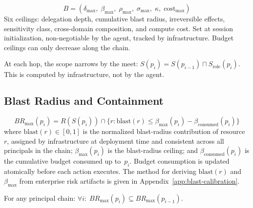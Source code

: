 \documentclass[sigconf,nonacm]{acmart}
\begin{document}
\begin{definition}\label{def:budget}
\[
B = (\delta_{\max},\; \beta_{\max},\; \rho_{\max},\; \sigma_{\max},\; \kappa,\; \mathrm{cost}_{\max})
\]
Six ceilings: delegation depth, cumulative blast radius, irreversible effects, sensitivity class, cross-domain composition, and compute cost. Set at session initialization, non-negotiable by the agent, tracked by infrastructure. Budget ceilings can only decrease along the chain.
\end{definition}

\begin{definition}\label{def:scoped}
At each hop, the scope narrows by the meet: $S(p_i) = S(p_{i-1}) \sqcap S_{\mathrm{role}}(p_i)$. This is computed by infrastructure, not by the agent.
\end{definition}

\subsection{Blast Radius and Containment}

\begin{definition}\label{def:blast}
\begin{equation*}
BR_{\max}(p_i) = R(S(p_i)) \cap \bigl\{r : \mathrm{blast}(r) \leq \beta_{\max}(p_i) - \beta_{\mathrm{consumed}}(p_i)\bigr\}
\end{equation*}
where $\mathrm{blast}(r) \in [0,1]$ is the normalized blast-radius contribution of resource~$r$, assigned by infrastructure at deployment time and consistent across all principals in the chain; $\beta_{\max}(p_i)$ is the blast-radius ceiling; and $\beta_{\mathrm{consumed}}(p_i)$ is the cumulative budget consumed up to~$p_i$. Budget consumption is updated atomically before each action executes. The method for deriving $\mathrm{blast}(r)$ and $\beta_{\max}$ from enterprise risk artifacts is given in Appendix~\ref{app:blast-calibration}.
\end{definition}

\begin{theorem}\label{thm:blast-radius}
For any principal chain: $\forall i:\; BR_{\max}(p_i) \subseteq BR_{\max}(p_{i-1})$.
\end{theorem}
\end{document}
